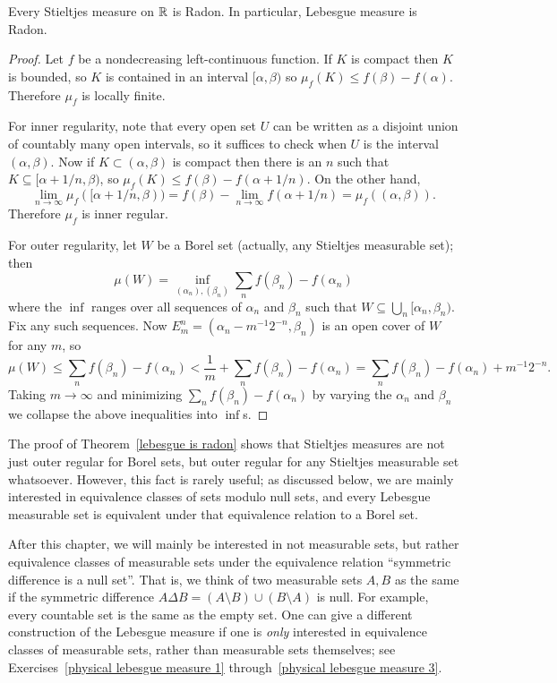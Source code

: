 \begin{theorem}\label{lebesgue is radon}
Every Stieltjes measure on $\mathbb{R}$ is Radon.
In particular, Lebesgue measure is Radon.
\end{theorem}
\begin{proof}
Let $f$ be a nondecreasing left-continuous function.
If $K$ is compact then $K$ is bounded, so $K$ is contained in an interval $[\alpha, \beta)$ so $\mu_{f}(K) \leq f(\beta) - f(\alpha)$.
Therefore $\mu_{f}$ is locally finite.

For inner regularity, note that every open set $U$ can be written as a disjoint union of countably many open intervals, so it suffices to check when $U$ is the interval $(\alpha, \beta)$.
Now if $K \subset (\alpha, \beta)$ is compact then there is an $n$ such that $K \subseteq [\alpha + 1/n, \beta)$, so $\mu_{f}(K) \leq f(\beta) - f(\alpha + 1/n)$.
On the other hand,
\[\lim_{n \to \infty} \mu_{f}([\alpha + 1/n, \beta)) = f(\beta) - \lim_{n \to \infty} f(\alpha + 1/n) = \mu_{f}((\alpha, \beta)).\]
Therefore $\mu_{f}$ is inner regular.

For outer regularity, let $W$ be a Borel set (actually, any Stieltjes measurable set); then
\[\mu(W) = \inf_{(\alpha_{n}), (\beta_{n})} \sum_{n} f(\beta_{n}) - f(\alpha_{n})\]
where the $\inf$ ranges over all sequences of $\alpha_{n}$ and $\beta_{n}$ such that $W \subseteq \bigcup_{n} [\alpha_{n}, \beta_{n})$.
Fix any such sequences.
Now $E_{m}^{n} = (\alpha_{n} - m^{-1}2^{-n}, \beta_{n})$ is an open cover of $W$ for any $m$, so
\[\mu(W) \leq \sum_{n} f(\beta_{n}) - f(\alpha_{n}) < \frac{1}{m} + \sum_{n} f(\beta_{n}) - f(\alpha_{n}) = \sum_{n} f(\beta_{n}) - f(\alpha_{n}) + m^{-1}2^{-n}.\]
Taking $m \to \infty$ and minimizing $\sum_{n} f(\beta_{n}) - f(\alpha_{n})$ by varying the $\alpha_{n}$ and $\beta_{n}$ we collapse the above inequalities into $\inf$s.
\end{proof}

\begin{subsec}
The proof of Theorem~\ref{lebesgue is radon} shows that Stieltjes measures are not just outer regular for Borel sets, but outer regular for any Stieltjes measurable set whatsoever.
However, this fact is rarely useful; as discussed below, we are mainly interested in equivalence classes of sets modulo null sets, and every Lebesgue measurable set is equivalent under that equivalence relation to a Borel set.
\end{subsec}

\begin{subsec}
After this chapter, we will mainly be interested in not measurable sets, but rather equivalence classes of measurable sets under the equivalence relation ``symmetric difference is a null set''.
That is, we think of two measurable sets $A,B$ as the same if the symmetric difference $A \Delta B = (A \setminus B) \cup (B \setminus A)$ is null.
For example, every countable set is the same as the empty set.
One can give a different construction of the Lebesgue measure if one is \emph{only} interested in equivalence classes of measurable sets, rather than measurable sets themselves; see Exercises~\ref{physical lebesgue measure 1} through~\ref{physical lebesgue measure 3}.
\end{subsec}

